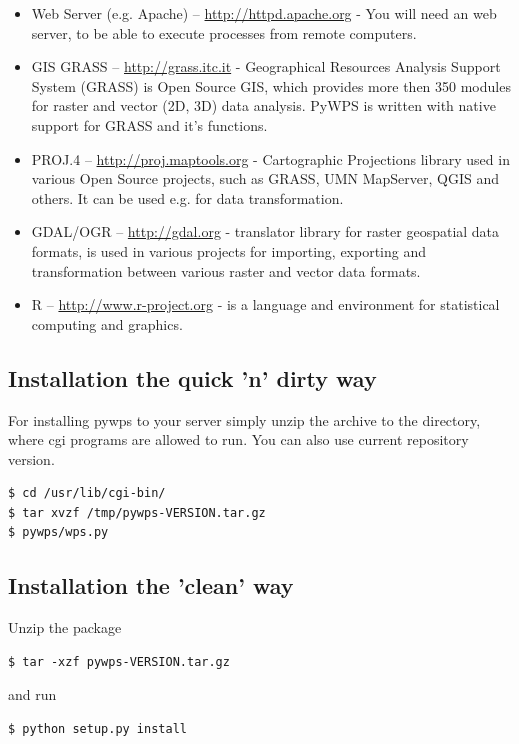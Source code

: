 \documentclass[a4paper,11pt]{article}
\begin{document}
\begin{itemize}
    \item Web Server (e.g. Apache) -- \url{http://httpd.apache.org} -  You
    will need an web server, to be able to execute processes from remote
    computers.

    \item GIS GRASS  -- \url{http://grass.itc.it} - Geographical Resources
    Analysis Support System (GRASS) is Open Source GIS, which provides more
    then 350 modules for raster and vector (2D, 3D) data analysis. PyWPS is
    written with native support for GRASS and it's functions.

    \item PROJ.4  -- \url{http://proj.maptools.org} - Cartographic
    Projections library used in various Open Source projects, such as
    GRASS, UMN MapServer, QGIS and others. It can be used e.g. for data
    transformation.

    \item GDAL/OGR  -- \url{http://gdal.org} - translator library for
    raster geospatial data formats, is used in various projects for
    importing, exporting and transformation between various raster and vector
    data formats.

    \item R  -- \url{http://www.r-project.org} - is a language and environment
    for statistical computing and graphics.

\end{itemize}
    
\subsection{Installation the quick 'n' dirty way}
For installing pywps to your server simply unzip the archive to the
directory, where cgi programs are allowed to run. You can also use current
repository version.

\begin{verbatim}
$ cd /usr/lib/cgi-bin/
$ tar xvzf /tmp/pywps-VERSION.tar.gz
$ pywps/wps.py
\end{verbatim}

\subsection{Installation the 'clean' way}
Unzip the package 
\begin{verbatim}
$ tar -xzf pywps-VERSION.tar.gz
\end{verbatim}
and run 
\begin{verbatim}
$ python setup.py install
\end{verbatim} 
\end{document}
